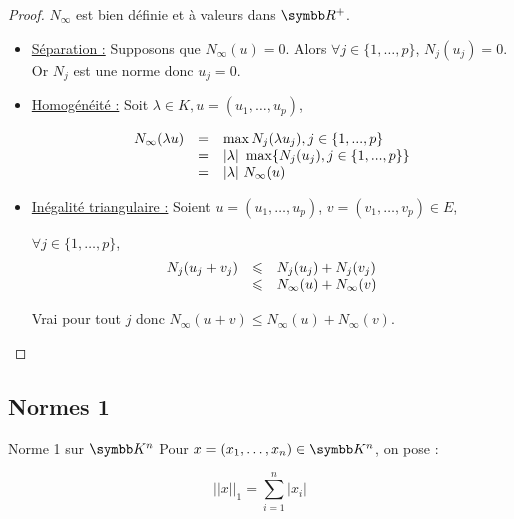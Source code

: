 \begin{proof}
    $N_\infty$ est bien définie et à valeurs dans $\R^+$.

    \begin{itemize}
        \item \uline{Séparation :}
        Supposons que $N_\infty(u) = 0$. 
        Alors $\forall j \in \{1, \dots, p\}$, $N_j(u_j) = 0$. 
        Or $N_j$ est une norme donc $u_j = 0$.

        \item \uline{Homogénéité :}
        Soit $\lambda \in K, u = (u_1, \dots, u_p)$,

        \[
            \begin{array}{rcl}
                N_\infty(\lambda u) & = & \max{N_j(\lambda u_j), j \in \{1, ..., p\}} \\
                \space & = & |\lambda| ~ \max\{N_j(u_j), j \in \{1, ..., p\}\} \\
                \space & = & |\lambda| ~ N_\infty(u) \\
            \end{array}
        \]

        \item \uline{Inégalité triangulaire :}
        Soient $u = (u_1, \dots, u_p)$, $v = (v_1, \dots, v_p) \in E$,

        $\forall j \in \{1, \dots, p\}$,
        \[
            \begin{array}{rcl}
                N_j(u_j + v_j) & \leqslant & N_j(u_j) + N_j(v_j) \\
                \space & \leqslant & N_\infty(u) + N_\infty(v) \\
            \end{array}
        \]

            Vrai pour tout $j$ donc $N_\infty(u + v) \leqslant N_\infty(u) + N_\infty(v)$.
    \end{itemize}
\end{proof}

\subsection{Normes 1}

\begin{definition}{Norme 1 sur $\K^n$}{}
    Pour $x = (x_1, \dots, x_n) \in \K^n$, on pose :

    \[||x||_1 = \sum_{i = 1 }^{n } |x_i|\]
\end{definition}

